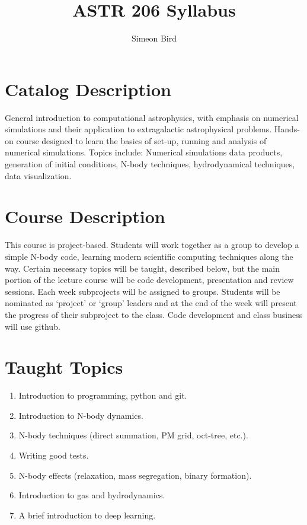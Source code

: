 \documentclass[12pt]{article}
\title{ASTR 206 Syllabus}
\author{Simeon Bird}
\date{}
\begin{document}
\maketitle

\section{Catalog Description}

General introduction to computational astrophysics, with emphasis on numerical simulations and their application to extragalactic astrophysical problems. Hands-on course designed to learn the basics of set-up, running and analysis of numerical simulations. Topics include: Numerical simulations data products, generation of initial conditions, N-body techniques, hydrodynamical techniques, data visualization.

\section{Course Description}

This course is project-based. Students will work together as a group to develop a simple N-body code, learning modern scientific computing techniques along the way. Certain necessary topics will be taught, described below, but the main portion of the lecture course will be code development, presentation and review sessions. Each week subprojects will be assigned to groups. Students will be nominated as `project' or `group' leaders and at the end of the week will present the progress of their subproject to the class. Code development and class business will use github.

\section{Taught Topics}

\begin{enumerate}
    \item Introduction to programming, python and git.
    \item Introduction to N-body dynamics.
    \item N-body techniques (direct summation, PM grid, oct-tree, etc.).
    \item Writing good tests.
    \item N-body effects (relaxation, mass segregation, binary formation).
    \item Introduction to gas and hydrodynamics.
    \item A brief introduction to deep learning.
\end{enumerate}
\end{document}
